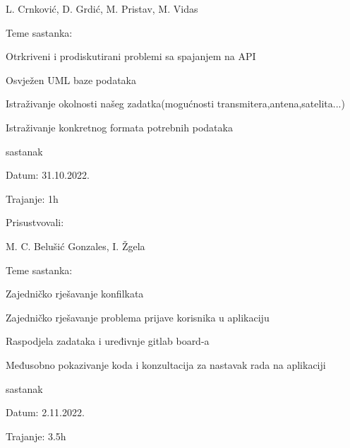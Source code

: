 \begin{packed_enum}
\begin{packed_item}
\begin{packed_enum}
		\item[]  L. Crnković,
		D. Grdić,
		M. Pristav,
		M. Vidas
	\end{packed_enum}
	\item Teme sastanka:
	\begin{packed_item}
		\item  Otrkriveni i prodiskutirani problemi sa spajanjem na API
		\item  Osvježen UML baze podataka
		\item  Istraživanje okolnosti našeg zadatka\newline (mogućnosti transmitera,antena,satelita...)
		\item  Istraživanje konkretnog formata potrebnih podataka
	\end{packed_item}
\end{packed_item}

\item  sastanak

\item[] \begin{packed_item}
	\item Datum: 31.10.2022.
	\item Trajanje: 1h
	
	
	\item Prisustvovali: \begin{packed_enum}
		
		\item[]  M. C. Belušić Gonzales,
		I. Žgela
		 
	\end{packed_enum}
	\item Teme sastanka:
	\begin{packed_item}
		\item  Zajedničko rješavanje konfilkata
		\item  Zajedničko rješavanje problema prijave korisnika u aplikaciju
		\item  Raspodjela zadataka i uređivnje gitlab board-a
		\item Međusobno pokazivanje koda i konzultacija za nastavak rada na aplikaciji
	\end{packed_item}
\end{packed_item}
\item  sastanak
\item[] \begin{packed_item}
	\item Datum: 2.11.2022.
	\item Trajanje: 3.5h
	

\end{packed_item}
\end{packed_enum}
